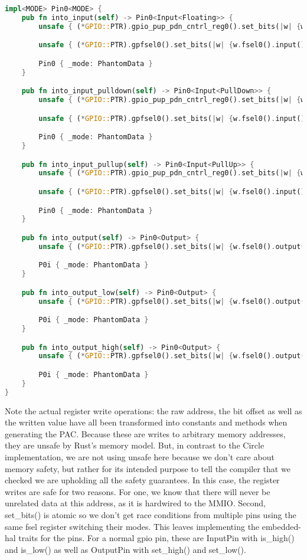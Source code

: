 \begin{lstlisting}[language=Rust,style=colouredRust]
impl<MODE> Pin0<MODE> {
    pub fn into_input(self) -> Pin0<Input<Floating>> {
        unsafe { (*GPIO::PTR).gpio_pup_pdn_cntrl_reg0().set_bits(|w| {w.gpio_pup_pdn_cntrl0().none()})}

        unsafe { (*GPIO::PTR).gpfsel0().set_bits(|w| {w.fsel0().input()}) };

        Pin0 { _mode: PhantomData }
    }

    pub fn into_input_pulldown(self) -> Pin0<Input<PullDown>> {
        unsafe { (*GPIO::PTR).gpio_pup_pdn_cntrl_reg0().set_bits(|w| {w.gpio_pup_pdn_cntrl0().down()})}

        unsafe { (*GPIO::PTR).gpfsel0().set_bits(|w| {w.fsel0().input()}) };

        Pin0 { _mode: PhantomData }
    }

    pub fn into_input_pullup(self) -> Pin0<Input<PullUp>> {
        unsafe { (*GPIO::PTR).gpio_pup_pdn_cntrl_reg0().set_bits(|w| {w.gpio_pup_pdn_cntrl0().up()})}

        unsafe { (*GPIO::PTR).gpfsel0().set_bits(|w| {w.fsel0().input()}) };

        Pin0 { _mode: PhantomData }
    }

    pub fn into_output(self) -> Pin0<Output> {
        unsafe { (*GPIO::PTR).gpfsel0().set_bits(|w| {w.fsel0().output()})}

        P0i { _mode: PhantomData }
    }

    pub fn into_output_low(self) -> Pin0<Output> {
        unsafe { (*GPIO::PTR).gpfsel0().set_bits(|w| {w.fsel0().output()})}

        P0i { _mode: PhantomData }
    }

    pub fn into_output_high(self) -> Pin0<Output> {
        unsafe { (*GPIO::PTR).gpfsel0().set_bits(|w| {w.fsel0().output()})}

        P0i { _mode: PhantomData }
    }
}
\end{lstlisting}

Note the actual register write operations: the raw address,
the bit offset as well as the written value have all been transformed into constants and methods when generating the PAC.
Because these are writes to arbitrary memory addresses, they are unsafe by Rust's memory model.
But, in contrast to the Circle implementation, we are not using unsafe here because we don't care about memory safety,
but rather for its intended purpose to tell the compiler that we checked we are upholding all the safety guarantees.
In this case, the register writes are safe for two reasons.
For one, we know that there will never be unrelated data at this address, as it is hardwired to the MMIO.
Second, set\_bits() is atomic so we don't get race conditions from multiple pins using the same fsel register switching their modes.
This leaves implementing the embedded-hal traits for the pins. For a normal gpio pin, these are InputPin with is\_high() and is\_low() as well as OutputPin with set\_high() and set\_low().

